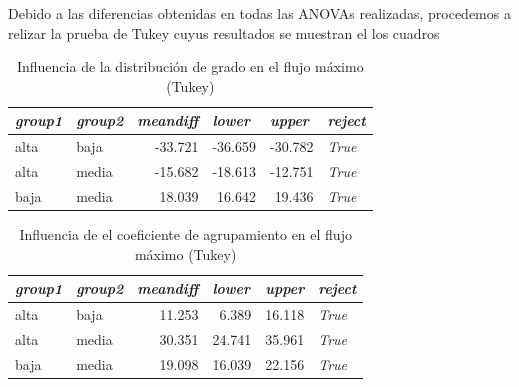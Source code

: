 \documentclass{article}
\begin{document}
Debido a las diferencias obtenidas en todas las ANOVAs realizadas, procedemos a relizar la prueba de Tukey cuyus resultados se muestran el los cuadros 

\begin{table}[htbp]
  \centering
  \caption{Influencia de la distribución de grado en el flujo máximo (Tukey)}
    \begin{tabular}{llrrrl}
    \toprule
    \textit{\textbf{group1}} & \textit{\textbf{group2}} & \multicolumn{1}{l}{\textit{\textbf{meandiff}}} & \multicolumn{1}{l}{\textit{\textbf{lower}}} & \multicolumn{1}{l}{\textit{\textbf{upper}}} & \textit{\textbf{reject}} \\
    \midrule
    alta  & baja  & -33.721 & -36.659 & -30.782 & \textit{True} \\
    alta  & media & -15.682 & -18.613 & -12.751 & \textit{True} \\
    baja  & media & 18.039 & 16.642 & 19.436 & \textit{True} \\
    \bottomrule
    \end{tabular}%
  \label{tab:t27}%
\end{table}%

\begin{table}[htbp]
  \centering
  \caption{Influencia de el coeficiente de agrupamiento en el flujo máximo (Tukey)}
    \begin{tabular}{llrrrl}
    \toprule
    \textit{\textbf{group1}} & \textit{\textbf{group2}} & \multicolumn{1}{l}{\textit{\textbf{meandiff}}} & \multicolumn{1}{l}{\textit{\textbf{lower}}} & \multicolumn{1}{l}{\textit{\textbf{upper}}} & \textit{\textbf{reject}} \\
    \midrule
    alta  & baja  & 11.253 & 6.389 & 16.118 & \textit{True} \\
    alta  & media & 30.351 & 24.741 & 35.961 & \textit{True} \\
    baja  & media & 19.098 & 16.039 & 22.156 & \textit{True} \\
    \bottomrule
    \end{tabular}%
  \label{tab:t28}%
\end{table}%
\end{document}
